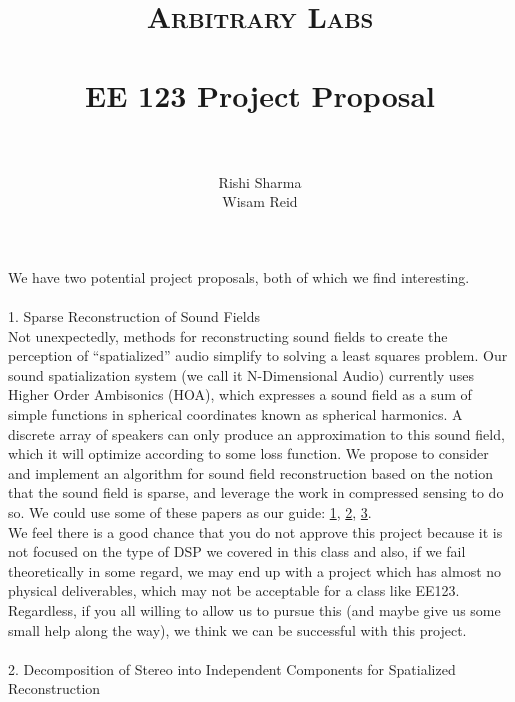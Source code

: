 \documentclass[paper=a4, fontsize=11pt]{scrartcl} %
\title{	
\normalfont \normalsize 
\textsc{Arbitrary Labs} \\ [5pt]
\horrule{0.5pt} \\[0.4cm] %
\huge EE 123 Project Proposal \\ %
\horrule{2pt} \\[-0.1cm] %
}
\author{Rishi Sharma\\ Wisam Reid}
\numberwithin{equation}{section} %
\numberwithin{figure}{section} %
\numberwithin{table}{section} %
\begin{document}
	
\maketitle %

We have two potential project proposals, both of which we find interesting.\\\\

{\Large 1. \indent Sparse Reconstruction of Sound Fields}\\

Not unexpectedly, methods for reconstructing sound fields to create the perception of ``spatialized'' audio simplify to solving a least squares problem. Our sound spatialization system (we call it N-Dimensional Audio) currently uses Higher Order Ambisonics (HOA), which expresses a sound field as a sum of simple functions in spherical coordinates known as spherical harmonics. A discrete array of speakers can only produce an approximation to this sound field, which it will optimize according to some loss function. We propose to consider and implement an algorithm for sound field reconstruction based on the notion that the sound field is sparse, and leverage the work in compressed sensing to do so. We could use some of these papers as our guide: \href{http://ieeexplore.ieee.org/stamp/stamp.jsp?tp=&arnumber=5346520}{1},  \href{http://ieeexplore.ieee.org/stamp/stamp.jsp?arnumber=05946441}{2},   \href{http://spincom.umn.edu/files/pdfs/tasl2010nov.pdf}{3}.\\

We feel there is a good chance that you do not approve this project because it is not focused on the type of DSP we covered in this class and also, if we fail theoretically in some regard, we may end up with a project which has almost no physical deliverables, which may not be acceptable for a class like EE123. Regardless, if you all willing to allow us to pursue this (and maybe give us some small help along the way), we think we can be successful with this project.\\\\

{\Large 2. \indent Decomposition of Stereo into Independent Components for Spatialized Reconstruction}\\
\end{document}
